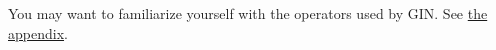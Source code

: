 You may want to familiarize yourself with the operators used by GIN.  See
\protect\hyperlink{%
  operator-definitions}{%
  the appendix}.
